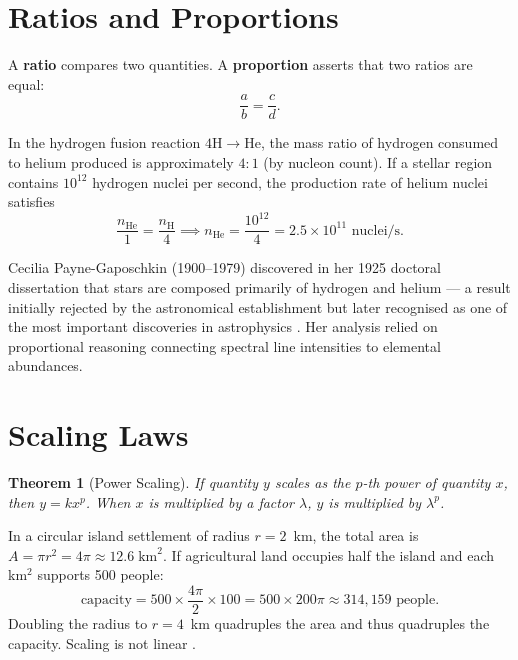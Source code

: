 \documentclass[11pt, openany]{book}
\theoremstyle{plain}
\newtheorem{theorem}{Theorem}[chapter]
\theoremstyle{definition}
\theoremstyle{remark}
\begin{document}
\section{Ratios and Proportions}

A \textbf{ratio} compares two quantities. A \textbf{proportion} asserts that
two ratios are equal:
\[
  \frac{a}{b}=\frac{c}{d}.
\]

\begin{myexample}
In the hydrogen fusion reaction $4\mathrm{H}\to\mathrm{He}$, the mass ratio of
hydrogen consumed to helium produced is approximately $4:1$ (by nucleon count).
If a stellar region contains $10^{12}$ hydrogen nuclei per second, the
production rate of helium nuclei satisfies
\[
  \frac{n_\mathrm{He}}{1}=\frac{n_\mathrm{H}}{4}
  \implies n_\mathrm{He}=\frac{10^{12}}{4}=2.5\times10^{11}\text{ nuclei/s}.
\]
\end{myexample}

\begin{history}
Cecilia Payne-Gaposchkin (1900--1979) discovered in her 1925 doctoral
dissertation that stars are composed primarily of hydrogen and helium --- a
result initially rejected by the astronomical establishment but later
recognised as one of the most important discoveries in astrophysics
\citep{PayneGaposchkin1925}. Her analysis relied on proportional reasoning
connecting spectral line intensities to elemental abundances.
\end{history}

\section{Scaling Laws}

\begin{theorem}[Power Scaling]
If quantity $y$ scales as the $p$-th power of quantity $x$, then $y=kx^p$.
When $x$ is multiplied by a factor $\lambda$, $y$ is multiplied by $\lambda^p$.
\end{theorem}

\begin{myexample}
In a circular island settlement of radius $r=2$~km, the total area is
$A=\pi r^2=4\pi\approx12.6\;\text{km}^2$. If agricultural land occupies
half the island and each km$^2$ supports 500 people:
\[
  \text{capacity} = 500\times\frac{4\pi}{2}\times100
  = 500\times200\pi\approx314{,}159\text{ people}.
\]
Doubling the radius to $r=4$~km quadruples the area and thus quadruples the
capacity. Scaling is not linear \citep{LeGuin1974}.
\end{myexample}
\end{document}
